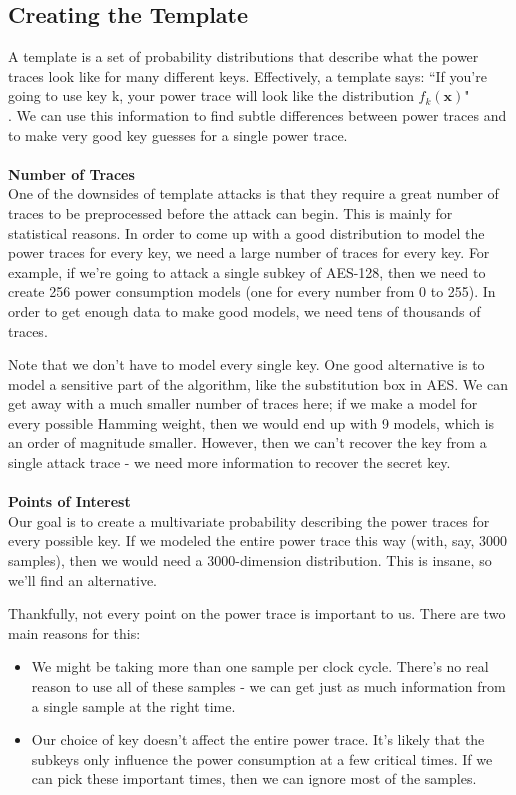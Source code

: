 \subsection{Creating the Template}
    A template is a set of probability distributions that describe what the power traces look like for many different keys. Effectively, a template says: ``If you're going to use key k, your power trace will look like the distribution $f_k(\mathbf{x})$"\\
    . We can use this information to find subtle differences between power traces and to make very good key guesses for a single power trace.\\
    \\
    \textbf{Number of Traces}\\
    One of the downsides of template attacks is that they require a great number of traces to be preprocessed before the attack can begin. This is mainly for statistical reasons. In order to come up with a good distribution to model the power traces for every key, we need a large number of traces for every key. For example, if we're going to attack a single subkey of AES-128, then we need to create 256 power consumption models (one for every number from 0 to 255). In order to get enough data to make good models, we need tens of thousands of traces.
    
    Note that we don't have to model every single key. One good alternative is to model a sensitive part of the algorithm, like the substitution box in AES. We can get away with a much smaller number of traces here; if we make a model for every possible Hamming weight, then we would end up with 9 models, which is an order of magnitude smaller. However, then we can't recover the key from a single attack trace - we need more information to recover the secret key.\\
    \\
    \textbf{Points of Interest}\\
    Our goal is to create a multivariate probability describing the power traces for every possible key. If we modeled the entire power trace this way (with, say, 3000 samples), then we would need a 3000-dimension distribution. This is insane, so we'll find an alternative.
    
    Thankfully, not every point on the power trace is important to us. There are two main reasons for this:
    \begin{itemize}
      \item We might be taking more than one sample per clock cycle.  There's no real reason to use all of these samples - we can get just as much information from a single sample at the right time.
      \item Our choice of key doesn't affect the entire power trace. It's likely that the subkeys only influence the power consumption at a few critical times. If we can pick these important times, then we can ignore most of the samples. 
    \end{itemize}
    
